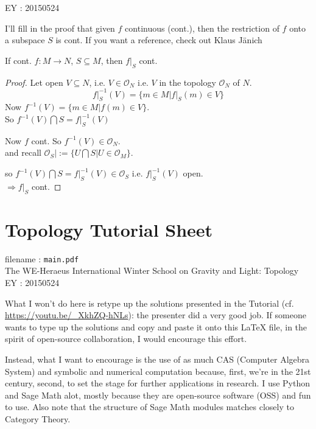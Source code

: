 EY : 20150524

I'll fill in the proof that given $f$ continuous (cont.), then the restriction of $f$ onto a subspace $S$ is cont.  If you want a reference, check out Klaus J\"{a}nich \cite[pp. 13, Ch. 1 Fundamental Concepts, Sec. Continuous Maps]{dgdt:KJanich1995}

If cont. $f: M \to N$, $S \subseteq M$, then $\left. f \right|_S$ cont.  

\begin{proof}
	Let open $V \subseteq N$, i.e. $V \in \mathcal{O}_N$ i.e. $V$ in the topology $\mathcal{O}_N$ of $N$.  
	\[
	\left. f\right|_S^{-1}(V) = \lbrace m \in M | \left. f \right|_S(m) \in V \rbrace
	\]
	Now $f^{-1}(V) = \lbrace m \in M | f(m) \in V \rbrace$. \\
	So $f^{-1}(V) \bigcap S = \left. f \right|_S^{-1}(V)$
	
	Now $f$ cont. So $f^{-1}(V) \in \mathcal{O}_N$.  \\
	and recall $\left. \mathcal{O}_S \right| := \lbrace U \bigcap S | U \in \mathcal{O}_M \rbrace$.  
	
	so $f^{-1}(V) \bigcap S = \left. f \right|_S^{-1}(V) \in \mathcal{O}_S$ i.e. $\left. f\right|_S^{-1}(V)$ open. \\
	$\Longrightarrow \left. f\right|_S$ cont.  
\end{proof}

\section*{Topology Tutorial Sheet}
filename : \texttt{main.pdf} \\
The WE-Heraeus International Winter School on Gravity and Light: Topology \\

EY : 20150524  

What I won't do here is retype up the solutions presented in the Tutorial (cf. \url{https://youtu.be/_XkhZQ-hNLs}): the presenter did a very good job.  If someone wants to type up the solutions and copy and paste it onto this LaTeX file, in the spirit of open-source collaboration, I would encourage this effort. 

Instead, what I want to encourage is the use of as much CAS (Computer Algebra System) and symbolic and numerical computation because, first, we're in the 21st century, second, to set the stage for further applications in research.  I use Python and Sage Math alot, mostly because they are open-source software (OSS) and fun to use.  Also note that the structure of Sage Math modules matches closely to Category Theory.  

